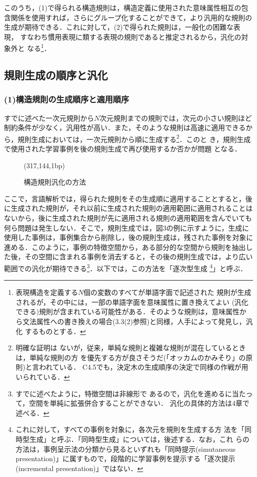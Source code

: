このうち，(1)で得られる構造規則は，構造定義に使用された意味属性相互の包
含関係を使用すれば，さらにグループ化することができて，より汎用的な規則の
生成が期待できる．これに対して，(2)で得られた規則は，一般化の困難な表現，
すなわち慣用表現に類する表現の規則であると推定されるから，汎化の対象外と
なる\footnote{表現構造を定義する$N$個の変数のすべてが単語字面で記述された
規則が生成されるが，その中には，一部の単語字面を意味属性に置き換えてよい
(汎化できる)規則が含まれている可能性がある．そのような規則は，意味属性か
ら文法属性への書き換えの場合(3.3(2)参照)と同様，人手によって発見し，汎化
するものとする．}．
\subsection{規則生成の順序と汎化}
\subsubsection*{(1)構造規則の生成順序と適用順序}
すでに述べた一次元規則から$N$次元規則までの規則では，次元の小さい規則ほど
制約条件が少なく，汎用性が高い．また，そのような規則は高速に適用できるか
ら，規則生成においては，一次元規則から順に生成する\footnote{明確な証明は
ないが，従来，単純な規則と複雑な規則が混在しているときは，単純な規則の方
を優先する方が良さそうだ(「オッカムのかみそり」の原則)と言われている．
C4.5でも，決定木の生成順序の決定で同様の作戦が用いられている．}．このと
き，規則生成で使用された学習事例を後の規則生成で再び使用するか否かが問題
となる．
\begin{figure}[thb]
\begin{center}
\begin{epsf}
\end{epsf}
\begin{draft}
\atari(317,144,1bp)
\end{draft}
\end{center}
\vspace*{-4mm}
\caption{構造規則汎化の方法}
\label{fig:構造規則汎化の方法}
\end{figure}

ここで，言語解析では，得られた規則をその生成順に適用することとすると，後
に生成された規則が，それ以前に生成された規則の適用範囲に適用されることは
ないから，後に生成された規則が先に適用される規則の適用範囲を含んでいても
何ら問題は発生しない．そこで，規則生成では，図3の例に示すように，生成に
使用した事例は，事例集合から削除し，後の規則生成は，残された事例を対象に
進める．このように，事例の特徴空間から，ある部分的な空間から規則を抽出し
た後，その空間に含まれる事例を消去すると，その後の規則生成では，より広い
範囲での汎化が期待できる\footnote{すでに述べたように，特徴空間は非線形で
あるので，汎化を進めるに当たって，空間を単純に拡張併合することができない．
汎化の具体的方法は4章で述べる．}．以下では，この方法を「逐次型生成
\footnote{これに対して，すべての事例を対象に，各次元を規則を生成する方
法を「同時型生成」と呼ぶ．「同時型生成」については，後述する．なお，これ
らの方法は，事例呈示法の分類から見るといずれも「同時提示(simutaneous
presentation)」に属すもので，段階的に学習事例を提示する「逐次提示
(incremental presentation)」ではない．}」と呼ぶ．

